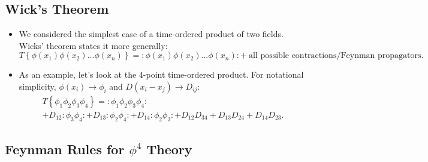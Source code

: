 \subsection*{Wick's Theorem}
\begin{itemize}
    \item We considered the simplest case of a time-ordered product of two fields. Wicks' theorem states it more generally:
        \begin{equation}
            T\left\{ \phi(x_1)\phi(x_2) \ldots \phi(x_n) \right\} = :\phi(x_1)\phi(x_2) \ldots \phi(x_n): + \ \text{all possible contractions/Feynman propagators}.
        \end{equation}
    \item As an example, let's look at the 4-point time-ordered product. For notational simplicity, $\phi(x_i) \rightarrow \phi_i$ and $D(x_i - x_j) \rightarrow D_{ij}$:
        \begin{multline*}
            T\left\{ \phi_1\phi_2\phi_3\phi_4 \right\} = :\phi_1\phi_2\phi_3\phi_4: \\
            + D_{12}:\phi_3\phi_4: + D_{13}:\phi_2\phi_4: + D_{14}:\phi_2\phi_3: + D_{12}D_{34} + D_{13}D_{24} + D_{14}D_{23}.
        \end{multline*}
\end{itemize}





\subsection*{Feynman Rules for \texorpdfstring{$\phi^4$}{phi4} Theory}

